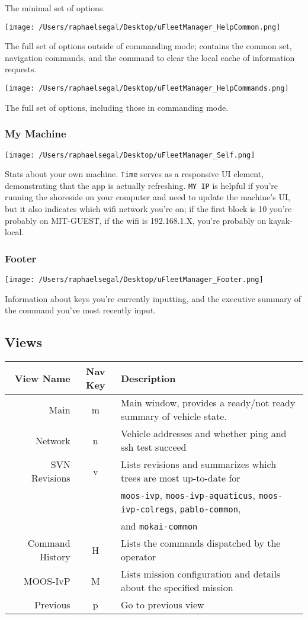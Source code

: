 \documentclass[11pt]{article}
\begin{document}
The minimal set of options.

\texttt{[image: /Users/raphaelsegal/Desktop/uFleetManager\_HelpCommon.png]}

The full set of options outside of commanding mode; contains the common set, navigation commands, and the command to clear the local cache of information requests.

\texttt{[image: /Users/raphaelsegal/Desktop/uFleetManager\_HelpCommands.png]}

The full set of options, including those in commanding mode.

\subsubsection{My Machine}
\texttt{[image: /Users/raphaelsegal/Desktop/uFleetManager\_Self.png]}

Stats about your own machine. \texttt{Time} serves as a responsive UI element, demonstrating that the app is actually refreshing. \texttt{MY IP} is helpful if you're running the shoreside on your computer and need to update the machine's UI, but it also indicates which wifi network you're on; if the first block is 10 you're probably on MIT-GUEST, if the wifi is 192.168.1.X, you're probably on kayak-local.
\subsubsection{Footer}
\texttt{[image: /Users/raphaelsegal/Desktop/uFleetManager\_Footer.png]}

Information about keys you're currently inputting, and the executive summary of the command you've most recently input.
\subsection{Views}
\begin{tabular}{r|cl}
View Name & Nav Key & Description\\
\hline
Main & m & Main window, provides a ready/not ready summary of vehicle state.\\
Network & n & Vehicle addresses and whether ping and ssh test succeed\\
SVN Revisions & v & Lists revisions and summarizes which trees are most up-to-date for\\&& \texttt{moos-ivp}, \texttt{moos-ivp-aquaticus}, \texttt{moos-ivp-colregs}, \texttt{pablo-common},\\
&& and \texttt{mokai-common}\\
Command History & H & Lists the commands dispatched by the operator\\
MOOS-IvP & M & Lists mission configuration and details about the specified mission\\
Previous & p & Go to previous view\\
\end{tabular}
\end{document}
